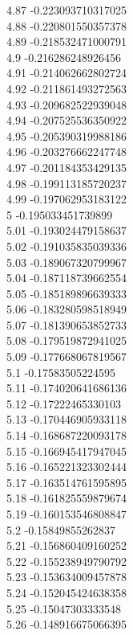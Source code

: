 {4.87	-0.223093710317025\\
4.88	-0.220801550357378\\
4.89	-0.218532471000791\\
4.9	-0.216286248926456\\
4.91	-0.214062662802724\\
4.92	-0.211861493272563\\
4.93	-0.209682522939048\\
4.94	-0.207525536350922\\
4.95	-0.205390319988186\\
4.96	-0.203276662247748\\
4.97	-0.201184353429135\\
4.98	-0.199113185720237\\
4.99	-0.197062953183122\\
5	-0.195033451739899\\
5.01	-0.193024479158637\\
5.02	-0.191035835039336\\
5.03	-0.189067320799967\\
5.04	-0.187118739662554\\
5.05	-0.185189896639333\\
5.06	-0.183280598518949\\
5.07	-0.181390653852733\\
5.08	-0.179519872941025\\
5.09	-0.177668067819567\\
5.1	-0.17583505224595\\
5.11	-0.174020641686136\\
5.12	-0.17222465330103\\
5.13	-0.170446905933118\\
5.14	-0.168687220093178\\
5.15	-0.166945417947045\\
5.16	-0.165221323302444\\
5.17	-0.163514761595895\\
5.18	-0.161825559879674\\
5.19	-0.160153546808847\\
5.2	-0.15849855262837\\
5.21	-0.156860409160252\\
5.22	-0.155238949790792\\
5.23	-0.153634009457878\\
5.24	-0.152045424638358\\
5.25	-0.15047303333548\\
5.26	-0.148916675066395\\
}
